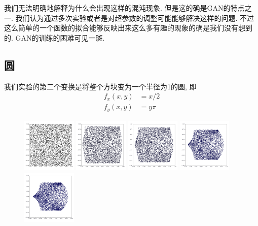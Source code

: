 \documentclass[lang=cn,11pt]{elegantpaper}
\begin{document}
我们无法明确地解释为什么会出现这样的混沌现象. 但是这的确是GAN的特点之一. 我们认为通过多次实验或者是对超参数的调整可能能够解决这样的问题. 不过这么简单的一个函数的拟合能够反映出来这么多有趣的现象的确是我们没有想到的. GAN的训练的困难可见一斑.


\subsection{圆}

我们实验的第二个变换是将整个方块变为一个半径为1的圆, 即
\begin{align}
	f_x(x,y)&=x/2 \\
	f_y(x,y)&=y\pi
\end{align}

\begin{figure}[hbt]
\centering
  \includegraphics[width=0.23\textwidth]{circle_1_1}
  \includegraphics[width=0.23\textwidth]{circle_1_2}
  \includegraphics[width=0.23\textwidth]{circle_1_3}
  \includegraphics[width=0.23\textwidth]{circle_1_4}\\
  \includegraphics[width=0.23\textwidth]{circle_1_5}

\end{figure}
\end{document}
